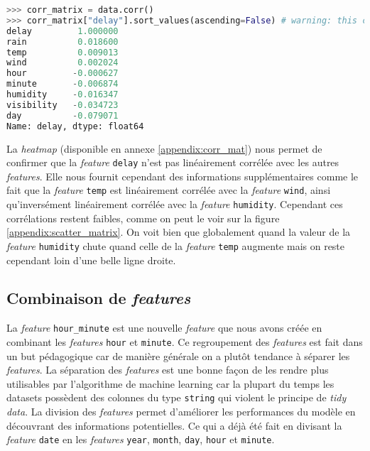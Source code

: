 \begin{lstlisting}[language=Python, caption=Coefficient standard de corrélation pour la \textit{feature} \lstinline!delay!., label=cscDelay]
>>> corr_matrix = data.corr()
>>> corr_matrix["delay"].sort_values(ascending=False) # warning: this check only linear correlation
delay         1.000000
rain          0.018600
temp          0.009013
wind          0.002024
hour         -0.000627
minute       -0.006874
humidity     -0.016347
visibility   -0.034723
day          -0.079071
Name: delay, dtype: float64
\end{lstlisting}

La \textit{heatmap} (disponible en annexe \ref{appendix:corr_mat}) nous permet de confirmer que la \textit{feature} \lstinline!delay! n'est pas linéairement corrélée avec les autres \textit{features}. Elle nous fournit cependant des informations supplémentaires comme le fait que la \textit{feature} \lstinline!temp! est linéairement corrélée avec la \textit{feature} \lstinline!wind!, ainsi qu'inversément linéairement corrélée avec la \textit{feature} \lstinline!humidity!. Cependant ces corrélations restent faibles, comme on peut le voir sur la figure \ref{appendix:scatter_matrix}. On voit bien que globalement quand la valeur de la \textit{feature} \lstinline!humidity! chute quand celle de la \textit{feature} \lstinline!temp! augmente mais on reste cependant loin d'une belle ligne droite.

\subsection{Combinaison de \textit{features}}
La \textit{feature} \lstinline!hour_minute! est une nouvelle \textit{feature} que nous avons créée en combinant les \textit{features} \lstinline!hour! et \lstinline!minute!. Ce regroupement des \textit{features} est fait dans un but pédagogique car de manière générale on a plutôt tendance à séparer les \textit{features}. La séparation des \textit{features} est une bonne façon de les rendre plus utilisables par l'algorithme de machine learning car la plupart du temps les datasets possèdent des colonnes du type \lstinline!string! qui violent le principe de \textit{tidy data}. La division des \textit{features} permet d'améliorer les performances du modèle en découvrant des informations potentielles. Ce qui a déjà été fait en divisant la \textit{feature} \lstinline!date! en les \textit{features} \lstinline!year!, \lstinline!month!, \lstinline!day!, \lstinline!hour! et \lstinline!minute!.

